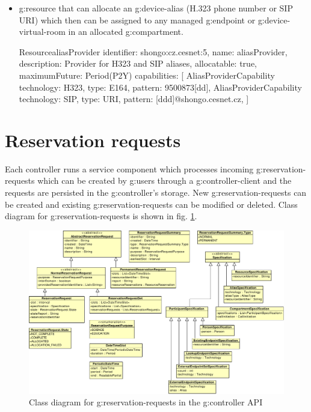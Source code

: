 \begin{itemize}
\item \Gls{g:resource} that can allocate an \gls{g:device-alias} (H.323 phone number or SIP URI) which then can be assigned to any managed \gls{g:endpoint} or \gls{g:device-virtual-room} in an allocated \gls{g:compartment}.

\begin{ObjectCode}{Resource}{aliasProvider}{}
identifier: shongo:cz.cesnet:5,
name: aliasProvider,
description: Provider for H323 and SIP aliases,
allocatable: true,
maximumFuture: Period(P2Y)
capabilities: [  
  AliasProviderCapability {
    technology: H323,
    type: E164,
    pattern: 9500873[dd],
  }
  AliasProviderCapability {
    technology: SIP,
    type: URI,
    pattern: [ddd]@shongo.cesnet.cz,
  }
]
\end{ObjectCode}

\end{itemize}


\section{Reservation requests}
\label{sec:implementation-reservation-request}

Each controller runs a service component which processes incoming \glspl{g:reservation-request} which can be created by \glspl{g:user} through a \gls{g:controller-client} and the requests are persisted in the \gls{g:controller}'s storage. New \glspl{g:reservation-request} can be created and existing \glspl{g:reservation-request} can be modified or deleted. Class diagram for \glspl{g:reservation-request} is shown in fig. \ref{fig:cd_api_reservation_requests}.

\begin{figure}[ht!]
\includegraphics[width=\textwidth]{diagrams/cd_api_reservation_requests}
\caption{Class diagram for \glspl{g:reservation-request} in the \gls{g:controller} API}
\label{fig:cd_api_reservation_requests}
\end{figure}

